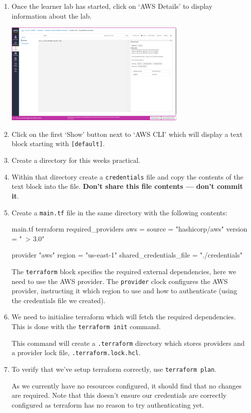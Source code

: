\documentclass{csse4400}
\begin{document}
\begin{enumerate}
\item Once the learner lab has started, click on `AWS Details' to display information about the lab.

\includegraphics[width=0.7\textwidth]{images/aws-details}

\item Click on the first `Show' button next to `AWS CLI' which will display a text block starting with \texttt{[default]}.
\item Create a directory for this weeks practical.
\item Within that directory create a \texttt{credentials} file and copy the contents of the text block into the file.
\textbf{Don't share this file contents --- don't commit it}.
\item Create a \texttt{main.tf} file in the same directory with the following contents:
\begin{code}[language=terraform]{main.tf}
terraform {
    required_providers {
        aws = {
            source  = "hashicorp/aws"
            version = "~> 3.0"
        }
    }
}

provider "aws" {
    region = "us-east-1"
    shared_credentials_file = "./credentials"
}
\end{code}

The \texttt{terraform} block specifies the required external dependencies, here we need to use the AWS provider.
The \texttt{provider} clock configures the AWS provider, instructing it which region to use and how to authenticate (using the credentials file we created).

\item We need to initialise terraform which will fetch the required dependencies. This is done with the \texttt{terraform init} command.

This command will create a \texttt{.terraform} directory which stores providers and a provider lock file, \texttt{.terraform.lock.hcl}.

\item To verify that we've setup terraform correctly, use \texttt{terraform plan}.

As we currently have no resources configured, it should find that no changes are required.
Note that this doesn't ensure our credentials are correctly configured as terraform has no reason to try authenticating yet.

\end{enumerate}
\end{document}

